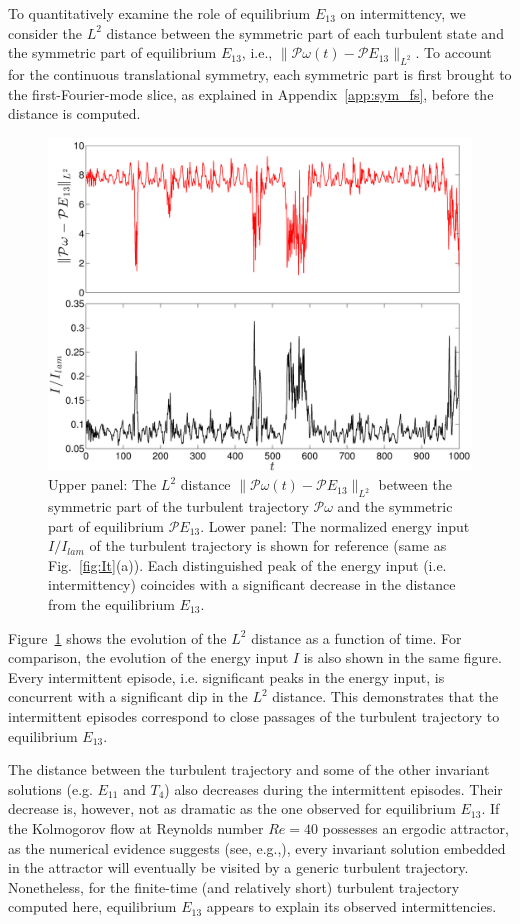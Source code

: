 \documentclass{article}
\begin{document}
To quantitatively examine the role of equilibrium $E_{13}$ on intermittency, we consider the $L^2$
distance between the symmetric part of each turbulent state and
the symmetric part of equilibrium $E_{13}$, i.e.,
$\|\mathcal P\omega (t)-\mathcal PE_{13}\|_{L^2}$.
To account for the continuous translational symmetry, each symmetric
part is first brought to the first-Fourier-mode slice,
as explained in Appendix~\ref{app:sym_fs}, before the distance is computed.
%
\begin{figure}[t]
\centering
\includegraphics[width=.75\textwidth]{R40_distFromE13_02}
\caption{Upper panel: The $L^2$ distance $\|\mathcal P\omega(t)-\mathcal PE_{13}\|_{L^2}$
between the symmetric part of the turbulent trajectory $\mathcal{P}\omega$
and the symmetric part of equilibrium $\mathcal PE_{13}$.
Lower panel: The normalized
energy input $I/I_{lam}$  of the turbulent
trajectory is shown for reference (same as Fig.~\ref{fig:It}(a)).
Each distinguished peak of the energy input (i.e. intermittency) coincides with a significant
decrease in the distance from the equilibrium $E_{13}$.}
\label{fig:distE13}
\end{figure}

Figure~\ref{fig:distE13} shows the evolution of the $L^2$ distance
as a function of time. For comparison, the evolution of the energy input $I$ is
also shown in the same figure. Every intermittent episode, i.e. significant peaks
in the energy input, is concurrent with a significant dip in the $L^2$ distance.
This demonstrates that the intermittent episodes correspond to
close passages of the turbulent trajectory to equilibrium $E_{13}$.

The distance between the turbulent trajectory and some of the other invariant
solutions (e.g. $E_{11}$ and $T_4$) also decreases during the intermittent episodes.
Their decrease is, however, not as dramatic as the one observed for equilibrium $E_{13}$.
If the Kolmogorov flow at Reynolds number $Re=40$ possesses an ergodic attractor,
as the numerical evidence suggests (see, e.g.,),
every invariant solution embedded in the attractor will
eventually be visited by a generic turbulent trajectory.
Nonetheless, for the finite-time (and relatively short)
turbulent trajectory computed here, equilibrium $E_{13}$ appears to explain its
observed intermittencies.
\end{document}
